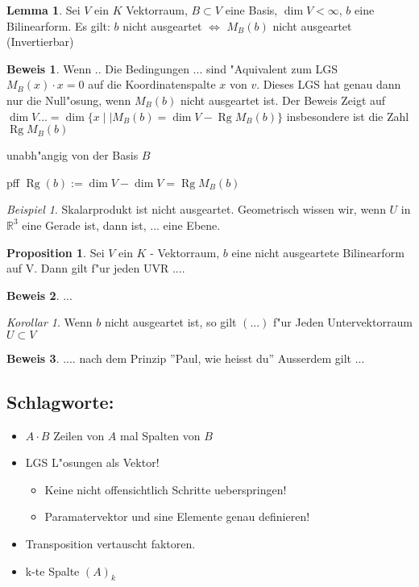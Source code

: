 \documentclass[11pt]{article}
\DeclareMathOperator{\mRg}{Rg}
\theoremstyle{remark}
\newtheorem{exa}{Beispiel}[section]
\theoremstyle{definition}
\newtheorem{prof}{Beweis}
\newtheorem*{proposition}{Proposition}
\newtheorem*{lemma}{Lemma}
\theoremstyle{remark}
\newtheorem*{korollar}{Korollar}
\begin{document}
\begin{lemma}
  Sei $V$ ein $K$ Vektorraum, $B\subset V$ eine Basis, $\dim V < \infty$, $b$
  eine Bilinearform. Es gilt: $b$ nicht ausgeartet $\iff$ $M_B(b)$ nicht
  ausgeartet (Invertierbar)
\end{lemma}

\begin{prof}
  Wenn ..
  Die Bedingungen ... sind "Aquivalent zum LGS $M_B(x) \cdot x = 0 $  auf die
  Koordinatenspalte $x$ von $v$. Dieses LGS hat genau dann nur die Null"osung,
  wenn $M_B(b)$ nicht ausgeartet ist. Der Beweis Zeigt auf $\dim V... = \dim
  \{x\mid|  M_B(b)= \dim V - \mRg M_B(b)\}$ insbesondere ist die Zahl $\mRg M_B(b)$

  unabh"angig von der Basis $B$
\end{prof}

\begin{definition}{pff}{}
  \(\mRg(b):=\dim V - \dim V = \mRg M_B(b)\)
\end{definition}

\begin{exa}
  Skalarprodukt ist nicht ausgeartet. Geometrisch wissen wir, wenn $U$ in
  $\mathbb{R}^3$ eine Gerade ist, dann ist, ... eine Ebene.
\end{exa}

\begin{proposition}
  Sei $V$ ein $K$ - Vektorraum, $b$ eine nicht ausgeartete Bilinearform auf V.
  Dann gilt f"ur jeden UVR ....
\end{proposition}

\begin{prof}
  ... 
\end{prof}

\begin{korollar}
  Wenn $b$ nicht ausgeartet ist, so gilt $(...)$ f"ur Jeden Untervektorraum
  $U\subset  V$
\end{korollar}
\begin{prof}
  .... nach dem Prinzip ''Paul, wie heisst du'' Ausserdem gilt ...
\end{prof}

\subsection{Schlagworte:}
\label{sec:orgcf8c685}
\begin{itemize}
\item \(A\cdot B\) Zeilen von \(A\) mal Spalten von \(B\)
\item LGS L"osungen als Vektor!
\begin{itemize}
\item Keine nicht offensichtlich Schritte ueberspringen!
\item Paramatervektor und sine Elemente genau definieren!
\end{itemize}
\item Transposition vertauscht faktoren.
\item k-te Spalte \((A)_k\)
\end{itemize}
\end{document}

